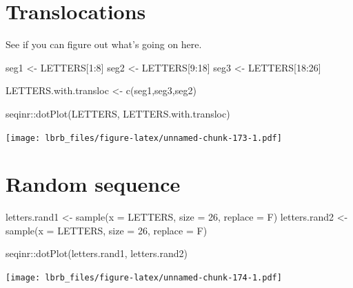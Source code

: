 \documentclass[
]{book}
\newenvironment{Shaded}{\begin{snugshade}}{\end{snugshade}}
\newcommand{\AttributeTok}[1]{\textcolor[rgb]{0.77,0.63,0.00}{#1}}
\newcommand{\DecValTok}[1]{\textcolor[rgb]{0.00,0.00,0.81}{#1}}
\newcommand{\FunctionTok}[1]{\textcolor[rgb]{0.00,0.00,0.00}{#1}}
\newcommand{\NormalTok}[1]{#1}
\newcommand{\OtherTok}[1]{\textcolor[rgb]{0.56,0.35,0.01}{#1}}
\newcommand{\SpecialCharTok}[1]{\textcolor[rgb]{0.00,0.00,0.00}{#1}}
\begin{document}
\hypertarget{translocations}{%
\section{Translocations}\label{translocations}}

See if you can figure out what's going on here.

\begin{Shaded}
\begin{Highlighting}[]
\NormalTok{seg1 }\OtherTok{\textless{}{-}}\NormalTok{ LETTERS[}\DecValTok{1}\SpecialCharTok{:}\DecValTok{8}\NormalTok{]}
\NormalTok{seg2 }\OtherTok{\textless{}{-}}\NormalTok{ LETTERS[}\DecValTok{9}\SpecialCharTok{:}\DecValTok{18}\NormalTok{]}
\NormalTok{seg3 }\OtherTok{\textless{}{-}}\NormalTok{ LETTERS[}\DecValTok{18}\SpecialCharTok{:}\DecValTok{26}\NormalTok{]}

\NormalTok{LETTERS.with.transloc }\OtherTok{\textless{}{-}} \FunctionTok{c}\NormalTok{(seg1,seg3,seg2)}

\NormalTok{seqinr}\SpecialCharTok{::}\FunctionTok{dotPlot}\NormalTok{(LETTERS, }
\NormalTok{                LETTERS.with.transloc)}
\end{Highlighting}
\end{Shaded}

\texttt{[image: lbrb\_files/figure-latex/unnamed-chunk-173-1.pdf]}

\hypertarget{random-sequence}{%
\section{Random sequence}\label{random-sequence}}

\begin{Shaded}
\begin{Highlighting}[]
\NormalTok{letters.rand1 }\OtherTok{\textless{}{-}} \FunctionTok{sample}\NormalTok{(}\AttributeTok{x =}\NormalTok{ LETTERS, }\AttributeTok{size =} \DecValTok{26}\NormalTok{, }\AttributeTok{replace =}\NormalTok{ F)}
\NormalTok{letters.rand2 }\OtherTok{\textless{}{-}} \FunctionTok{sample}\NormalTok{(}\AttributeTok{x =}\NormalTok{ LETTERS, }\AttributeTok{size =} \DecValTok{26}\NormalTok{, }\AttributeTok{replace =}\NormalTok{ F)}


\NormalTok{seqinr}\SpecialCharTok{::}\FunctionTok{dotPlot}\NormalTok{(letters.rand1, }
\NormalTok{                letters.rand2)}
\end{Highlighting}
\end{Shaded}

\texttt{[image: lbrb\_files/figure-latex/unnamed-chunk-174-1.pdf]}
\end{document}
